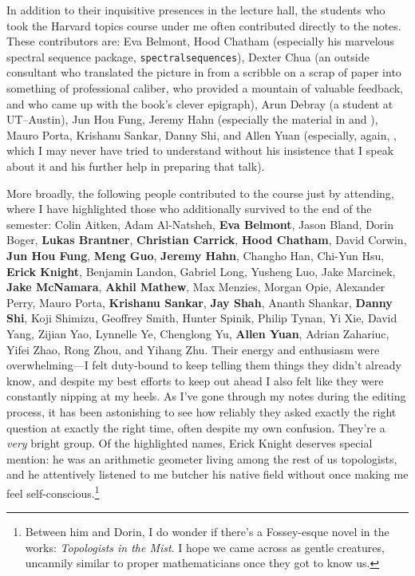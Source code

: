 In addition to their inquisitive presences in the lecture hall, the students who took the Harvard topics course under me often contributed directly to the notes.  These contributors are: Eva Belmont, Hood Chatham (especially his marvelous spectral sequence package, \texttt{spectralsequences}), Dexter Chua (an outside consultant who translated the picture in  from a scribble on a scrap of paper into something of professional caliber, who provided a mountain of valuable feedback, and who came up with the book's clever epigraph), Arun Debray (a student at UT--Austin), Jun Hou Fung, Jeremy Hahn (especially the material in  and ), Mauro Porta, Krishanu Sankar, Danny Shi, and Allen Yuan (especially, again, , which I may never have tried to understand without his insistence that I speak about it and his further help in preparing that talk).

More broadly, the following people contributed to the course just by attending, where I have highlighted those who additionally survived to the end of the semester: Colin Aitken, Adam Al-Natsheh, \textbf{Eva Belmont}, Jason Bland, Dorin Boger, \textbf{Lukas Brantner}, \textbf{Christian Carrick}, \textbf{Hood Chatham}, David Corwin, \textbf{Jun Hou Fung}, \textbf{Meng Guo}, \textbf{Jeremy Hahn}, Changho Han, Chi-Yun Hsu, \textbf{Erick Knight}, Benjamin Landon, Gabriel Long, Yusheng Luo, Jake Marcinek, \textbf{Jake McNamara}, \textbf{Akhil Mathew}, Max Menzies, Morgan Opie, Alexander Perry, Mauro Porta, \textbf{Krishanu Sankar}, \textbf{Jay Shah}, Ananth Shankar, \textbf{Danny Shi}, Koji Shimizu, Geoffrey Smith, Hunter Spinik, Philip Tynan, Yi Xie, David Yang, Zijian Yao, Lynnelle Ye, Chenglong Yu, \textbf{Allen Yuan}, Adrian Zahariuc, Yifei Zhao, Rong Zhou, and Yihang Zhu.  Their energy and enthusiasm were overwhelming---I felt duty-bound to keep telling them things they didn't already know, and despite my best efforts to keep out ahead I also felt like they were constantly nipping at my heels.  As I've gone through my notes during the editing process, it has been astonishing to see how reliably they asked exactly the right question at exactly the right time, often despite my own confusion.  They're a \emph{very} bright group.  Of the highlighted names, Erick Knight deserves special mention: he was an arithmetic geometer living among the rest of us topologists, and he attentively listened to me butcher his native field without once making me feel self-conscious.\footnote{Between him and Dorin, I do wonder if there's a Fossey-esque novel in the works: \textit{Topologists in the Mist}.  I hope we came across as gentle creatures, uncannily similar to proper mathematicians once they got to know us.}

